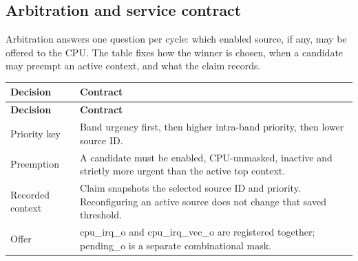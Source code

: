 \documentclass[11pt]{article}
\begin{document}
\subsection{Arbitration and service contract}
\noindent Arbitration answers one question per cycle: which enabled source, if any, may be offered to the CPU. The table fixes how the winner is chosen, when a candidate may preempt an active context, and what the claim records.\par\medskip
{\small
\begin{longtable}{@{}L{0.2400\dimexpr\linewidth-12pt\relax}L{0.7600\dimexpr\linewidth-12pt\relax}@{}}
\toprule
\textbf{Decision} & \textbf{Contract} \\ \midrule
\endfirsthead
\toprule
\textbf{Decision} & \textbf{Contract} \\ \midrule
\endhead
Priority key & Band urgency first, then higher intra-band priority, then lower source ID. \\ \addlinespace[3pt]
Preemption & A candidate must be enabled, CPU-unmasked, inactive and strictly more urgent than the active top context. \\ \addlinespace[3pt]
Recorded context & Claim snapshots the selected source ID and priority. Reconfiguring an active source does not change that saved threshold. \\ \addlinespace[3pt]
Offer & cpu\_irq\_o and cpu\_irq\_vec\_o are registered together; pending\_o is a separate combinational mask. \\*
\bottomrule\end{longtable}}

\end{document}
